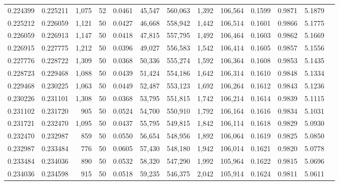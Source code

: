 \begin{tabular}{rrrrrrrrrrrrr}
0.224399 & 0.225211 & 1,075 &  52 &                                     0.0461 &  45,547 & 560,063 &   1,392 & 106,564 & 0.1599 & 0.9871 & 5.1879 \\
0.225212 & 0.226059 & 1,121 &  50 &                                     0.0427 &  46,668 & 558,942 &   1,442 & 106,514 & 0.1601 & 0.9866 & 5.1775 \\
0.226059 & 0.226913 & 1,147 &  50 &                                     0.0418 &  47,815 & 557,795 &   1,492 & 106,464 & 0.1603 & 0.9862 & 5.1669 \\
0.226915 & 0.227775 & 1,212 &  50 &                                     0.0396 &  49,027 & 556,583 &   1,542 & 106,414 & 0.1605 & 0.9857 & 5.1556 \\
0.227776 & 0.228722 & 1,309 &  50 &                                     0.0368 &  50,336 & 555,274 &   1,592 & 106,364 & 0.1608 & 0.9853 & 5.1435 \\
0.228723 & 0.229468 & 1,088 &  50 &                                     0.0439 &  51,424 & 554,186 &   1,642 & 106,314 & 0.1610 & 0.9848 & 5.1334 \\
0.229468 & 0.230225 & 1,063 &  50 &                                     0.0449 &  52,487 & 553,123 &   1,692 & 106,264 & 0.1612 & 0.9843 & 5.1236 \\
0.230226 & 0.231101 & 1,308 &  50 &                                     0.0368 &  53,795 & 551,815 &   1,742 & 106,214 & 0.1614 & 0.9839 & 5.1115 \\
0.231102 & 0.231720 &   905 &  50 &                                     0.0524 &  54,700 & 550,910 &   1,792 & 106,164 & 0.1616 & 0.9834 & 5.1031 \\
0.231721 & 0.232470 & 1,095 &  50 &                                     0.0437 &  55,795 & 549,815 &   1,842 & 106,114 & 0.1618 & 0.9829 & 5.0930 \\
0.232470 & 0.232987 &   859 &  50 &                                     0.0550 &  56,654 & 548,956 &   1,892 & 106,064 & 0.1619 & 0.9825 & 5.0850 \\
0.232987 & 0.233484 &   776 &  50 &                                     0.0605 &  57,430 & 548,180 &   1,942 & 106,014 & 0.1621 & 0.9820 & 5.0778 \\
0.233484 & 0.234036 &   890 &  50 &                                     0.0532 &  58,320 & 547,290 &   1,992 & 105,964 & 0.1622 & 0.9815 & 5.0696 \\
0.234036 & 0.234598 &   915 &  50 &                                     0.0518 &  59,235 & 546,375 &   2,042 & 105,914 & 0.1624 & 0.9811 & 5.0611 \\

\end{tabular}
